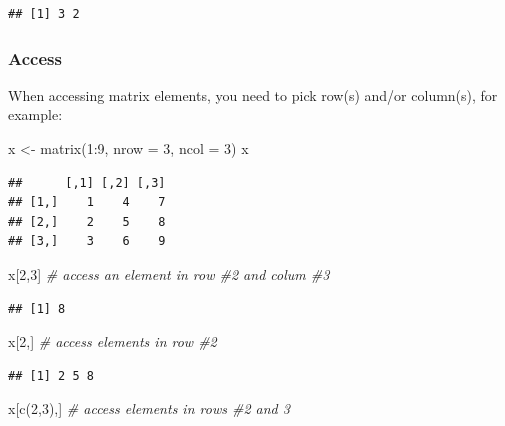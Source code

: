 \documentclass[
]{article}
\newenvironment{Shaded}{\begin{snugshade}}{\end{snugshade}}
\newcommand{\AttributeTok}[1]{\textcolor[rgb]{0.77,0.63,0.00}{#1}}
\newcommand{\CommentTok}[1]{\textcolor[rgb]{0.56,0.35,0.01}{\textit{#1}}}
\newcommand{\DecValTok}[1]{\textcolor[rgb]{0.00,0.00,0.81}{#1}}
\newcommand{\FunctionTok}[1]{\textcolor[rgb]{0.00,0.00,0.00}{#1}}
\newcommand{\NormalTok}[1]{#1}
\newcommand{\OtherTok}[1]{\textcolor[rgb]{0.56,0.35,0.01}{#1}}
\newcommand{\SpecialCharTok}[1]{\textcolor[rgb]{0.00,0.00,0.00}{#1}}
\begin{document}
\begin{verbatim}
## [1] 3 2
\end{verbatim}

\hypertarget{access-1}{%
\subsubsection{Access}\label{access-1}}

When accessing matrix elements, you need to pick row(s) and/or column(s), for example:

\begin{Shaded}
\begin{Highlighting}[]
\NormalTok{x }\OtherTok{\textless{}{-}} \FunctionTok{matrix}\NormalTok{(}\DecValTok{1}\SpecialCharTok{:}\DecValTok{9}\NormalTok{, }\AttributeTok{nrow =} \DecValTok{3}\NormalTok{, }\AttributeTok{ncol =} \DecValTok{3}\NormalTok{)}
\NormalTok{x}
\end{Highlighting}
\end{Shaded}

\begin{verbatim}
##      [,1] [,2] [,3]
## [1,]    1    4    7
## [2,]    2    5    8
## [3,]    3    6    9
\end{verbatim}

\begin{Shaded}
\begin{Highlighting}[]
\NormalTok{x[}\DecValTok{2}\NormalTok{,}\DecValTok{3}\NormalTok{] }\CommentTok{\# access an element in row \#2 and colum \#3}
\end{Highlighting}
\end{Shaded}

\begin{verbatim}
## [1] 8
\end{verbatim}

\begin{Shaded}
\begin{Highlighting}[]
\NormalTok{x[}\DecValTok{2}\NormalTok{,] }\CommentTok{\# access elements in row \#2}
\end{Highlighting}
\end{Shaded}

\begin{verbatim}
## [1] 2 5 8
\end{verbatim}

\begin{Shaded}
\begin{Highlighting}[]
\NormalTok{x[}\FunctionTok{c}\NormalTok{(}\DecValTok{2}\NormalTok{,}\DecValTok{3}\NormalTok{),] }\CommentTok{\# access elements in rows \#2 and 3}
\end{Highlighting}
\end{Shaded}
\end{document}
